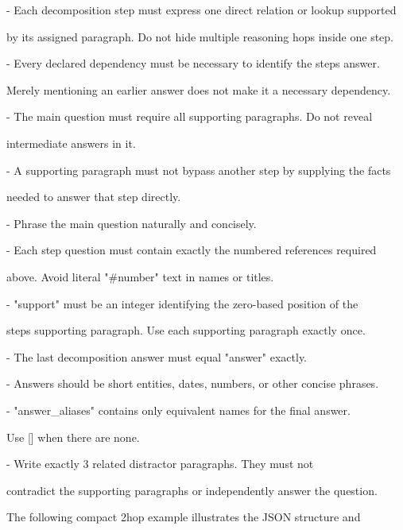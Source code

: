 \begin{promptbox}
- Each decomposition step must express one direct relation or lookup supported\par
\hspace*{1em}by its assigned paragraph. Do not hide multiple reasoning hops inside one step.\par
- Every declared dependency must be necessary to identify the step\textquotesingle{}s answer.\par
\hspace*{1em}Merely mentioning an earlier answer does not make it a necessary dependency.\par
- The main question must require all supporting paragraphs. Do not reveal\par
\hspace*{1em}intermediate answers in it.\par
- A supporting paragraph must not bypass another step by supplying the facts\par
\hspace*{1em}needed to answer that step directly.\par
- Phrase the main question naturally and concisely.\par
- Each step question must contain exactly the numbered references required\par
\hspace*{1em}above. Avoid literal "\#number" text in names or titles.\par
- "support" must be an integer identifying the zero-based position of the\par
\hspace*{1em}step\textquotesingle{}s supporting paragraph. Use each supporting paragraph exactly once.\par
- The last decomposition answer must equal "answer" exactly.\par
- Answers should be short entities, dates, numbers, or other concise phrases.\par
- "answer\_aliases" contains only equivalent names for the final answer.\par
\hspace*{1em}Use [] when there are none.\par
- Write exactly 3 related distractor paragraphs. They must not\par
\hspace*{1em}contradict the supporting paragraphs or independently answer the question.\par
\promptblank
The following compact 2hop example illustrates the JSON structure and\par

\end{promptbox}

